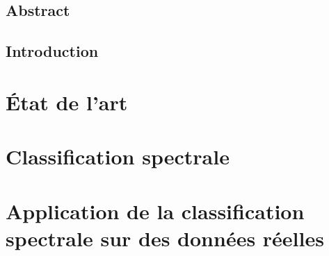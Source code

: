 \documentclass[12pt,fleqn]{report} %
\begin{document}
\renewcommand{\contentsname}{Contents}                %
\renewcommand{\bibname}{Bibliography}  %



\tableofcontents  %
\cleardoublepage  %

\chapter*{Abstract}


\chapter*{Introduction}



\part{État de l'art}


\part{Classification spectrale}



\part{Application de la classification spectrale sur des données réelles}

\end{document}
